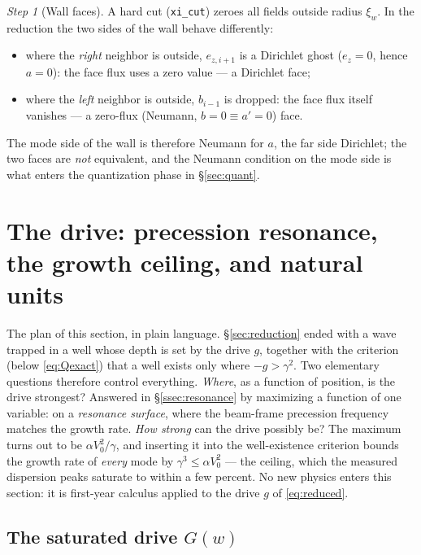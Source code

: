 \documentclass[11pt,a4paper]{article}
\numberwithin{equation}{section}
\theoremstyle{remark}
\newtheorem{step}{Step}[subsection]
\newcommand{\Vo}{V_0}
\begin{document}
\begin{step}[Wall faces]
A hard cut (\texttt{xi\_cut}) zeroes all fields outside radius $\xi_w$. In
the reduction the two sides of the wall behave differently:
\begin{itemize}
\item where the \emph{right} neighbor is outside, $e_{z,i+1}$ is a
Dirichlet ghost ($e_z=0$, hence $a=0$): the face flux uses a zero value
--- a Dirichlet face;
\item where the \emph{left} neighbor is outside, $b_{i-1}$ is dropped:
the face flux itself vanishes --- a zero-flux (Neumann, $b=0\equiv a'=0$)
face.
\end{itemize}
The mode side of the wall is therefore Neumann for $a$, the far side
Dirichlet; the two faces are \emph{not} equivalent, and the Neumann
condition on the mode side is what enters the quantization phase in
\S\ref{sec:quant}.
\end{step}

\section{The drive: precession resonance, the growth ceiling, and natural
units}
\label{sec:ceiling}

The plan of this section, in plain language.
\S\ref{sec:reduction} ended with a wave trapped in a well whose depth is
set by the drive $g$, together with the criterion (below
\eqref{eq:Qexact}) that a well exists only where $-g>\gamma^2$. Two
elementary questions therefore control everything. \emph{Where}, as a
function of position, is the drive strongest? Answered in
\S\ref{ssec:resonance} by maximizing a function of one variable: on a
\emph{resonance surface}, where the beam-frame precession frequency
matches the growth rate. \emph{How strong} can the drive possibly be?
The maximum turns out to be $\alpha\Vo^2/\gamma$, and inserting it into
the well-existence criterion bounds the growth rate of \emph{every}
mode by $\gamma^3\le\alpha\Vo^2$ --- the ceiling, which the measured
dispersion peaks saturate to within a few percent. No new physics
enters this section: it is first-year calculus applied to the drive $g$
of \eqref{eq:reduced}.

\subsection{The saturated drive $G(w)$}
\label{ssec:G}
\end{document}

